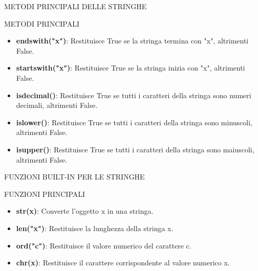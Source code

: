 \documentclass[aspectratio=1610]{beamer}
\begin{document}
\begin{frame}{METODI PRINCIPALI DELLE STRINGHE}
    \begin{alertblock}{METODI PRINCIPALI}
        \begin{minipage}{0.98\linewidth}
            \justifying
            \begin{itemize}
                \item \textbf{endswith("x")}: Restituisce True se la stringa termina con "x", altrimenti False.
                \pause
                \item \textbf{startswith("x")}: Restituisce True se la stringa inizia con "x", altrimenti False.
                \pause
                \item \textbf{isdecimal()}: Restituisce True se tutti i caratteri della stringa sono numeri decimali, altrimenti False.
                \pause
                \item \textbf{islower()}: Restituisce True se tutti i caratteri della stringa sono minuscoli, altrimenti False.
                \pause
                \item \textbf{isupper()}: Restituisce True se tutti i caratteri della stringa sono maiuscoli, altrimenti False.
            \end{itemize}
        \end{minipage}
    \end{alertblock}
\end{frame}

\begin{frame}{FUNZIONI BUILT-IN PER LE STRINGHE}
    \begin{alertblock}{FUNZIONI PRINCIPALI}
        \begin{minipage}{0.98\linewidth}
            \justifying
            \begin{itemize}
                \item \textbf{str(x)}: Converte l'oggetto x in una stringa.
                \pause
                \item \textbf{len("x")}: Restituisce la lunghezza della stringa x.
                \pause
                \item \textbf{ord("c")}: Restituisce il valore numerico del carattere c.
                \pause
                \item \textbf{chr(x)}: Restituisce il carattere corrispondente al valore numerico x.
            \end{itemize}
        \end{minipage}
    \end{alertblock}
\end{frame}
\end{document}
